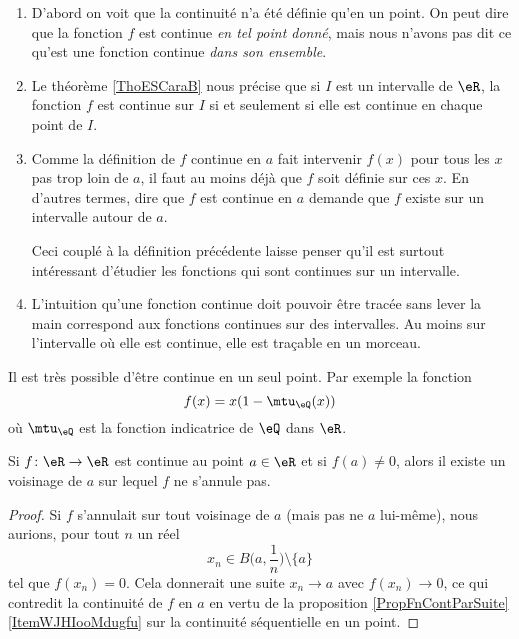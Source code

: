 \begin{enumerate}
	\item D'abord on voit que la continuité n'a été définie qu'en un point. On peut dire que la fonction $f$ est continue \emph{en tel point donné}, mais nous n'avons pas dit ce qu'est une fonction continue \emph{dans son ensemble}.

	\item
	      Le théorème \ref{ThoESCaraB} nous précise que si $I$ est un intervalle de $\eR$, la fonction $f$ est continue sur $I$ si et seulement si elle est continue en chaque point de $I$.

	\item Comme la définition de $f$ continue en $a$ fait intervenir $f(x)$ pour tous les $x$ pas trop loin de $a$, il faut au moins déjà que $f$ soit définie sur ces $x$. En d'autres termes, dire que $f$ est continue en $a$ demande que $f$ existe sur un intervalle autour de $a$.

	      Ceci couplé à la définition précédente laisse penser qu'il est surtout intéressant d'étudier les fonctions qui sont continues sur un intervalle.

	\item L'intuition qu'une fonction continue doit pouvoir être tracée sans lever la main correspond aux fonctions continues sur des intervalles. Au moins sur l'intervalle où elle est continue, elle est traçable en un morceau.
\end{enumerate}

\begin{example}
	Il est très possible d'être continue en un seul point. Par exemple la fonction
	\begin{equation}
		f(x)=x(1-\mtu_{\eQ}(x))
	\end{equation}
	où \( \mtu_{\eQ}\) est la fonction indicatrice de \( \eQ\) dans \( \eR\).
\end{example}

\begin{proposition}     \label{PROPooUBUAooNIxjfg}
	Si \( f\colon \eR\to \eR\) est continue au point \( a\in \eR\) et si \( f(a)\neq 0\), alors il existe un voisinage de \( a\) sur lequel \( f\) ne s'annule pas.
\end{proposition}

\begin{proof}
	Si \( f \) s'annulait sur tout voisinage de \( a\) (mais pas ne \( a\) lui-même), nous aurions, pour tout \( n\) un réel
	\begin{equation}
		x_n\in B\big( a,\frac{1}{ n } \big)\setminus\{ a \}
	\end{equation}
	tel que \( f(x_n)=0\). Cela donnerait une suite \( x_n\to a\) avec \( f(x_n)\to 0\), ce qui contredit la continuité de \( f\) en \( a\) en vertu de la proposition \ref{PropFnContParSuite}\ref{ItemWJHIooMdugfu} sur la continuité séquentielle en un point.
\end{proof}

